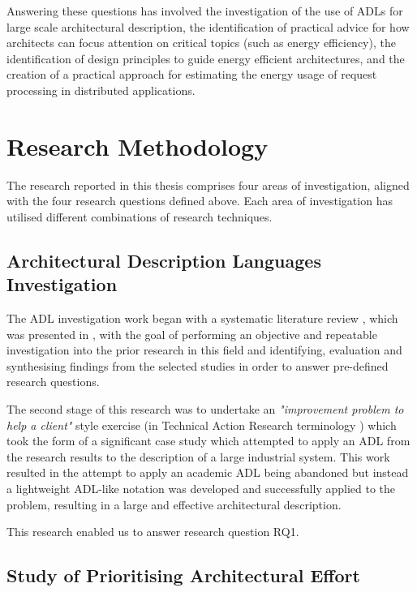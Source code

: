 Answering these questions has involved the investigation of the use of ADLs for large scale architectural description, the identification of practical advice for how architects can focus attention on critical topics (such as energy efficiency), the identification of design principles to guide energy efficient architectures, and the creation of a practical approach for estimating the energy usage of request processing in distributed applications.

\section{Research Methodology}

The research reported in this thesis comprises four areas of investigation, aligned with the four research questions defined above.  Each area of investigation has utilised different combinations of research techniques.

\subsection{Architectural Description Languages Investigation}

The ADL investigation work began with a systematic literature review \cite{kitchenham2007-slr}, which was presented in , with the goal of performing an objective and repeatable investigation into the prior research in this field and identifying, evaluation and synthesising findings from the selected studies in order to answer pre-defined research questions.  

The second stage of this research was to undertake an \emph{"improvement problem to help a client"} style exercise (in Technical Action Research terminology \cite{wieringa2012-tar}) which took the form of a significant case study which attempted to apply an ADL from the research results to the description of a large industrial system.  This work resulted in the attempt to apply an academic ADL being abandoned but instead a lightweight ADL-like notation was developed and successfully applied to the problem, resulting in a large and effective architectural description.

This research enabled us to answer research question RQ1.

\subsection{Study of Prioritising Architectural Effort}

